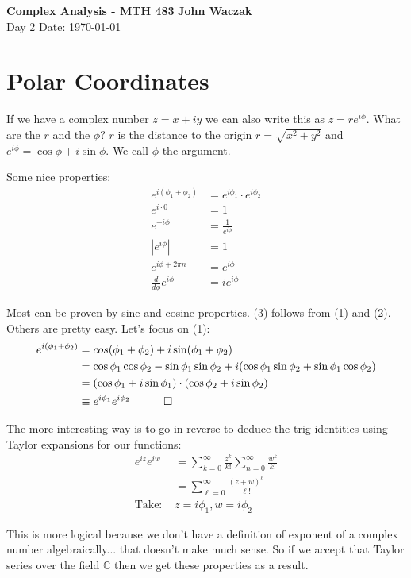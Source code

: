 \documentclass[a4paper, 11pt]{article}
\begin{document}
\noindent
\large\textbf{Complex Analysis - MTH 483} \hfill \textbf{John Waczak} \\
\normalsize Day 2 \hfill  Date: \today \\


\section*{Polar Coordinates}
If we have a complex number $z=x + iy$ we can also write this as $z= re^{i\phi}$. What are the $r$ and the $\phi$? $r$ is the distance to the origin $r=\sqrt{x^2+y^2}$ and $e^{i\phi} = \cos\phi + i\sin\phi$. We call $\phi$ the argument. 

Some nice properties:
	\begin{align}
		e^{i(\phi_1+\phi_2)} &= e^{i\phi_1}\cdot e^{i\phi_2} \\ 
		e^{i\cdot 0} &= 1 \\
		e^{-i\phi} &= \frac{1}{e^{i\phi}} \\
		|e^{i\phi}|&= 1 \\
		e^{i\phi+2\pi n} &= e^{i\phi} \\ 
		\frac{d}{d\phi}e^{i\phi} &= ie^{i\phi}
	\end{align}

Most can be proven by sine and cosine properties. (3) follows from (1) and (2). Others are pretty easy. Let's focus on (1):
	\begin{align*}
		e^{i(\phi_1+\phi_2)} &= cos(\phi_1+\phi_2)+i\sin(\phi_1+\phi_2) \\ 
		 &= \cos\phi_1\cos\phi_2 - \sin\phi_1\sin\phi_2 +i(\cos\phi_1\sin\phi_2+\sin\phi_1\cos\phi_2) \\ 
		 &= (\cos\phi_1+i\sin\phi_1)\cdot(\cos\phi_2+i\sin\phi_2) \\
		 &\equiv e^{i\phi_1}e^{i\phi_2} \quad \qed
	\end{align*}

The more interesting way is to go in reverse to deduce the trig identities using Taylor expansions for our functions:
	\begin{align*}
		e^{iz}e^{iw} &= \sum_{k=0}^\infty \frac{z^k}{k!}\sum_{n=0}^\infty \frac{w^k}{k!} \\ 
		&= \sum_{\ell =0}^\infty \frac{(z+w)^\ell}{\ell!} \\ 
		\text{Take: }& z=i\phi_1, w=i\phi_2
	\end{align*}
	
This is more logical because we don't have a definition of exponent of a complex number algebraically... that doesn't make much sense. So if we accept that Taylor series over the field $\mathbb{C}$ then we get these properties as a result. \\
\end{document}
